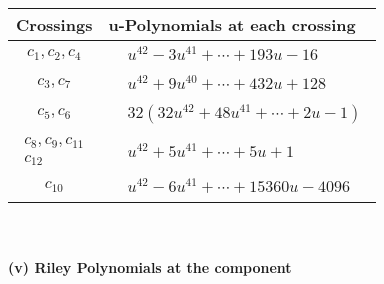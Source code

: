 \documentclass[1p]{elsarticle_modified}
\theoremstyle{definition}
\begin{document}
\begin{tabular}{m{50pt}|m{274pt}}
Crossings & \hspace{64pt}u-Polynomials at each crossing \\
\hline $$\begin{aligned}c_{1},c_{2},c_{4}\end{aligned}$$&$\begin{aligned}
&u^{42}-3 u^{41}+\cdots+193 u-16
\end{aligned}$\\
\hline $$\begin{aligned}c_{3},c_{7}\end{aligned}$$&$\begin{aligned}
&u^{42}+9 u^{40}+\cdots+432 u+128
\end{aligned}$\\
\hline $$\begin{aligned}c_{5},c_{6}\end{aligned}$$&$\begin{aligned}
&32(32 u^{42}+48 u^{41}+\cdots+2 u-1)
\end{aligned}$\\
\hline $$\begin{aligned}c_{8},c_{9},c_{11}\\c_{12}\end{aligned}$$&$\begin{aligned}
&u^{42}+5 u^{41}+\cdots+5 u+1
\end{aligned}$\\
\hline $$\begin{aligned}c_{10}\end{aligned}$$&$\begin{aligned}
&u^{42}-6 u^{41}+\cdots+15360 u-4096
\end{aligned}$\\
\hline
\end{tabular}\\~\\
\newpage\renewcommand{\arraystretch}{1}
\flushleft \textbf{(v) Riley Polynomials at the component}\newline \\
\end{document}
